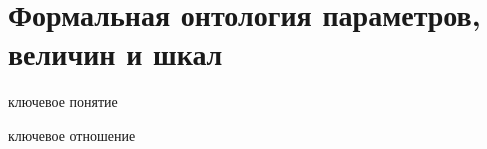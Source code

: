 \begin{comment}
\scnheader{соответствие*}
\scnidtf{наличие соответствия*}
\scniselement{бинарное отношение}
\begin{scnsubdividing}
	\scnitem{соответствие между непересекающимися множествами*}
	\scnitem{соответствие между строго пересекающимися множествами*}
	\scnitem{соответствие, область отправления и область прибытия которого совпадают*}
\end{scnsubdividing}
\begin{scnsubdividing}
	\scnitem{всюду определенное соответствие*}
	\scnitem{частично определенное соответствие*}
\end{scnsubdividing}
\begin{scnsubdividing}
	\scnitem{сюръекция*}
	\scnitem{несюръективное соответствие*}
\end{scnsubdividing}
\begin{scnsubdividing}
	\scnitem{однозначное соответствие*}
	\scnitem{неоднозначное соответствие*}
\end{scnsubdividing}
\scntext{определение}{\textbf{\textit{соответствие*}} --- \textit{бинарное ориентированное отношение}, каждая пара которого связывает два множества и указывает на наличие некоторого отношения, связывающего элементы этих двух множеств.}
	
	
\scnheader{область отправления\scnrolesign}
\scnidtf{область отправления соответствия\scnrolesign}
\scnidtf{область определения соответствия\scnrolesign}
\scnidtf{первый компонент пары в отношении соответствия\scnrolesign}
\scniselement{ролевое отношение}
\scntext{определение}{\textbf{\textit{область отправления\scnrolesign}} --- \textit{ролевое отношение}, указывающее на первый компонент пары в рамках отношения \textit{соответствие*}.}
	
\scnheader{область прибытия\scnrolesign}
\scnidtf{область прибытия соответствия\scnrolesign}
\scnidtf{область значений соответствия\scnrolesign}
\scniselement{ролевое отношение}
\scntext{определение}{\textbf{\textit{область прибытия\scnrolesign}} --- \textit{ролевое отношение}, указывающее на второй компонент пары в рамках отношения \textit{соответствие*}.}
\end{SCn}


\end{comment}
\section{Формальная онтология параметров, величин и шкал}
\label{sec_top_ontologies_params}

\begin{SCn}
\begin{scnrelfromlist}{ключевое понятие}
\end{scnrelfromlist}

\begin{scnrelfromlist}{ключевое отношение}
\end{scnrelfromlist}
\end{SCn}

